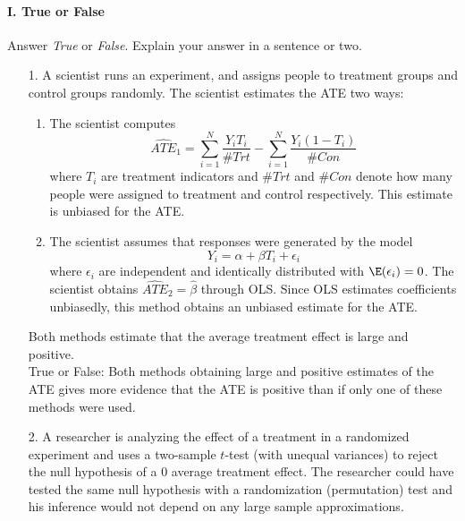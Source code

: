 \documentclass{article}
\begin{document}
\paragraph{\Large I. True or False}
Answer {\em True} or {\em False}.  Explain your answer in a sentence or two.
\begin{itemize}
\item[1.]   A scientist runs an experiment, and assigns people to 
      treatment groups and control groups randomly.
      The scientist estimates the ATE two ways: 
      \begin{enumerate}
        \item The scientist computes
          $$
            \widehat{ATE}_1 = \sum_{i=1}^N \frac{Y_iT_i}{\#Trt} -\sum_{i=1}^N \frac{Y_i(1-T_i)}{\#Con} 
          $$
           where $T_i$ are treatment indicators and 
           $\#Trt$ and $\#Con$ denote how many people were assigned to 
           treatment and control respectively.
           This estimate is unbiased for the ATE.
         \item The scientist assumes that responses were generated by the model
           $$
             Y_i = \alpha + \beta T_i + \epsilon_i
           $$
           where $\epsilon_i$ are independent
           and identically distributed with $\E(\epsilon_i) = 0$.
           The scientist obtains $\widehat{ATE}_2 = \hat\beta $ through OLS.
           Since OLS estimates coefficients unbiasedly, this 
           method obtains an unbiased estimate for the ATE.
      \end{enumerate}
      Both methods estimate that the average treatment effect is large and positive.\\[1ex]
      True or False:  
      Both methods obtaining large and positive estimates of the ATE gives 
      more evidence that the ATE is positive than if
      only one of these methods were used.
\item[2.]  A researcher is analyzing the effect of a treatment in a
  randomized experiment and uses a two-sample $t$-test (with unequal
  variances) to reject the null hypothesis of a 0 average treatment
  effect. The researcher could have tested the same null hypothesis
  with a randomization (permutation) test and his inference would not
  depend on any large sample approximations.


\end{itemize}
\end{document}
